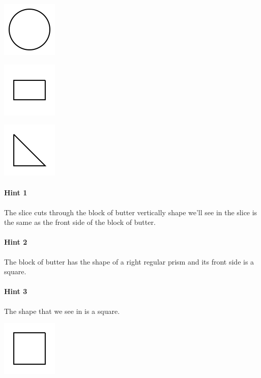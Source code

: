 \documentclass[twocolumn,10pt]{article}
\def\shrinkfactor{0.4}
\begin{document}
 
\includegraphics[scale=\shrinkfactor]{figures/9bf34a29bc62816f07057d9e571de844df484cd9.png}


\includegraphics[scale=\shrinkfactor]{figures/0e5042b475e0847d67b74c0482f8e8173f798656.png}


\includegraphics[scale=\shrinkfactor]{figures/02361468f7d85874956214c7a0a119b84a8c2651.png}



\paragraph{Hint 1}The slice cuts through the block of butter vertically \DIFdelbegin {}\DIFdelend \DIFaddbegin {}\DIFaddend shape we'll see in the slice is the same as the front side of the block of butter.

\paragraph{Hint 2}The block of butter has the shape of a right regular prism and its front side is a square.

\paragraph{Hint 3}The shape that we see in \DIFdelbegin {}\DIFdelend \DIFaddbegin {}\DIFaddend is a square.  

\includegraphics[scale=\shrinkfactor]{figures/4b59a0ece6acc7c19c389e1de534d1df93bf1169.png}
\end{document}
